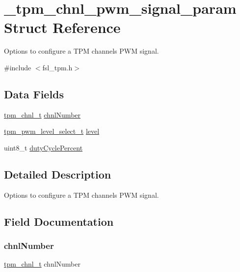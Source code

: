 \hypertarget{struct__tpm__chnl__pwm__signal__param}{}\section{\+\_\+tpm\+\_\+chnl\+\_\+pwm\+\_\+signal\+\_\+param Struct Reference}
\label{struct__tpm__chnl__pwm__signal__param}


Options to configure a T\+PM channel\textquotesingle{}s P\+WM signal.  




{\ttfamily \#include $<$fsl\+\_\+tpm.\+h$>$}

\subsection*{Data Fields}
\begin{DoxyCompactItemize}
\item 
\mbox{\hyperlink{group__tpm_gacda6962369e014c8ac72d1b58b224deb}{tpm\+\_\+chnl\+\_\+t}} \mbox{\hyperlink{struct__tpm__chnl__pwm__signal__param_addc94dba6576d0b40cd83b493968a2e4}{chnl\+Number}}
\item 
\mbox{\hyperlink{group__tpm_gaa50bc4e977e2e6e8abcbfc39d79f0674}{tpm\+\_\+pwm\+\_\+level\+\_\+select\+\_\+t}} \mbox{\hyperlink{struct__tpm__chnl__pwm__signal__param_a6dc96c2d40aecc0f3b18fcca3bc68cb6}{level}}
\item 
uint8\+\_\+t \mbox{\hyperlink{struct__tpm__chnl__pwm__signal__param_ab45db07ca1a7d947eb8ddd735fc28efb}{duty\+Cycle\+Percent}}
\end{DoxyCompactItemize}


\subsection{Detailed Description}
Options to configure a T\+PM channel\textquotesingle{}s P\+WM signal. 

\subsection{Field Documentation}
\mbox{\label{struct__tpm__chnl__pwm__signal__param_addc94dba6576d0b40cd83b493968a2e4}} 
\subsubsection{\texorpdfstring{chnlNumber}{chnlNumber}}
{\footnotesize\ttfamily \mbox{\hyperlink{group__tpm_gacda6962369e014c8ac72d1b58b224deb}{tpm\+\_\+chnl\+\_\+t}} chnl\+Number}


